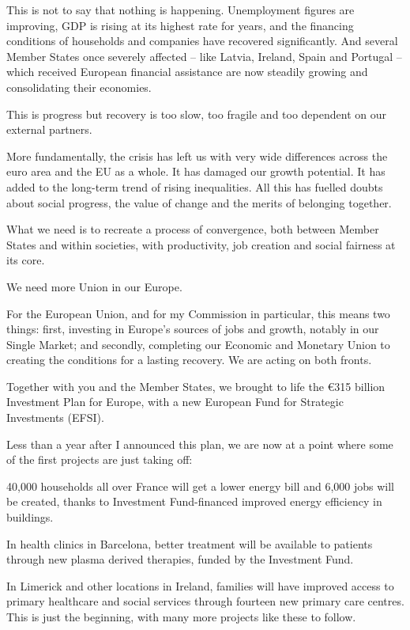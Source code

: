 \documentclass[a4paper,11pt]{article}
\begin{document}
This is not to say that nothing is happening. Unemployment figures are improving, GDP is rising at its highest rate for years, and the financing conditions of households and companies have recovered significantly. And several Member States once severely affected – like Latvia, Ireland, Spain and Portugal – which received European financial assistance are now steadily growing and consolidating their economies.

This is progress but recovery is too slow, too fragile and too dependent on our external partners.

More fundamentally, the crisis has left us with very wide differences across the euro area and the EU as a whole. It has damaged our growth potential. It has added to the long-term trend of rising inequalities. All this has fuelled doubts about social progress, the value of change and the merits of belonging together.

What we need is to recreate a process of convergence, both between Member States and within societies, with productivity, job creation and social fairness at its core.

We need more Union in our Europe.

For the European Union, and for my Commission in particular, this means two things: first, investing in Europe's sources of jobs and growth, notably in our Single Market; and secondly, completing our Economic and Monetary Union to creating the conditions for a lasting recovery. We are acting on both fronts.

Together with you and the Member States, we brought to life the \euro315 billion Investment Plan for Europe, with a new European Fund for Strategic Investments (EFSI).

Less than a year after I announced this plan, we are now at a point where some of the first projects are just taking off:

40,000 households all over France will get a lower energy bill and 6,000 jobs will be created, thanks to Investment Fund-financed improved energy efficiency in buildings.

In health clinics in Barcelona, better treatment will be available to patients through new plasma derived therapies, funded by the Investment Fund.

In Limerick and other locations in Ireland, families will have improved access to primary healthcare and social services through fourteen new primary care centres. This is just the beginning, with many more projects like these to follow.
\end{document}
